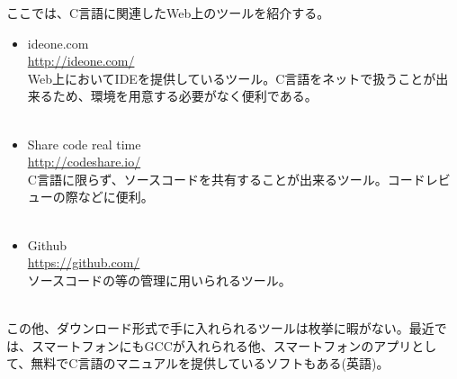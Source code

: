 ここでは、C言語に関連したWeb上のツールを紹介する。

\begin{itemize}
\item ideone.com\\
\url{http://ideone.com/}\\
Web上においてIDEを提供しているツール。C言語をネットで扱うことが出来るため、環境を用意する必要がなく便利である。\\　
\item Share code real time\\
\url{http://codeshare.io/}\\
C言語に限らず、ソースコードを共有することが出来るツール。コードレビューの際などに便利。\\　
\item Github\\
\url{https://github.com/}\\
ソースコードの等の管理に用いられるツール。\\　
\end{itemize}

この他、ダウンロード形式で手に入れられるツールは枚挙に暇がない。最近では、スマートフォンにもGCCが入れられる他、スマートフォンのアプリとして、無料でC言語のマニュアルを提供しているソフトもある(英語)。
